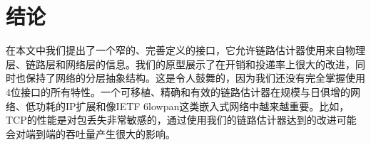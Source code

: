 \documentclass[12pt,a4paper]{article}
\begin{document}
\section{结论}

在本文中我们提出了一个窄的、完善定义的接口，它允许链路估计器使用来自物理层、链路层和网络层的信息。我们的原型展示了在开销和投递率上很大的改进，同时也保持了网络的分层抽象结构。这是令人鼓舞的，因为我们还没有完全掌握使用4位接口的所有特性。一个可移植、精确和有效的链路估计器在规模与日俱增的网络、低功耗的IP扩展和像IETF 6lowpan这类嵌入式网络中越来越重要。比如，TCP的性能是对包丢失非常敏感的，通过使用我们的链路估计器达到的改进可能会对端到端的吞吐量产生很大的影响。

\wuhao


\end{document}

